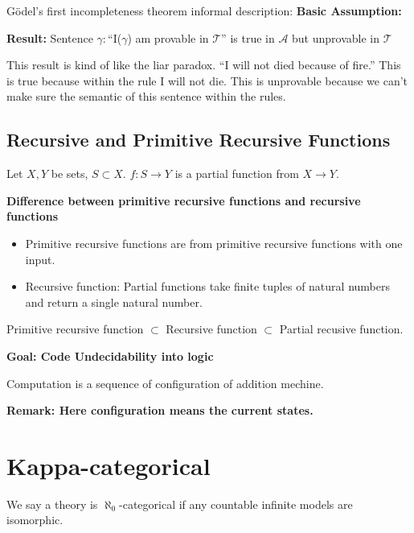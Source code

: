 \documentclass[11pt]{article}
\begin{document}
Gödel's first incompleteness theorem informal description:
\textbf{Basic Assumption:}
\begin{center}\end{center}

\textbf{Result:}
Sentence \(\gamma:\)``I(\(\gamma\)) am provable in \(\mathcal{T}\)'' is true in \(\mathcal{A}\) but unprovable in \(\mathcal{T}\)

This result is kind of like the liar paradox. ``I will not died because of fire.'' This is true because within the rule I will not die. This is unprovable because we can't make sure the semantic of this sentence within the rules.
\subsection{Recursive and Primitive Recursive Functions}
\label{sec:orgbd23541}

\begin{definition}
Let \(X,Y\) be sets, \(S\subset X\). \(f:S\to Y\) is a partial function from \(X\to Y\).
\end{definition}

\textbf{Difference between primitive recursive functions and recursive functions}
\begin{itemize}
\item Primitive recursive functions are from primitive recursive functions with one input.
\item Recursive function: Partial functions take finite tuples of natural numbers and return a single natural number.
\end{itemize}

\begin{proposition}[ ]
Primitive recursive function \(\subset\) Recursive function \(\subset\) Partial recusive function.
\end{proposition}

\begin{definition}

\end{definition}

\textbf{Goal: Code Undecidability into logic}

\begin{definition}[Computation]
Computation is a sequence of configuration of addition mechine.
\end{definition}

\textbf{Remark: Here configuration means the current states.}
\section{Kappa-categorical}
\label{sec:org36b97e1}
\begin{definition}
We say a theory is \(\aleph_0\)-categorical if any countable infinite models are isomorphic.
\end{definition}
\end{document}
